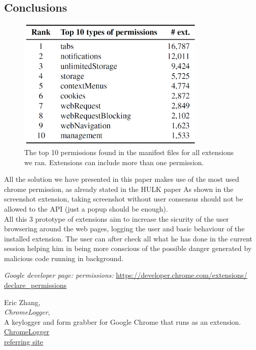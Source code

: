 \documentclass[12pt]{article}
\begin{document}
\begin{multicols}{2}
\section*{Conclusions}
\begin{figure}[H]
	\begin{center}
		\includegraphics[width=9cm]{permission.png}
		\caption{The top 10 permissions found in the manifest
			files for all extensions we ran. Extensions can include			
			more than one permission.}
	\end{center}
\end{figure}
All the solution we have presented in this paper makes use of the most used chrome permission, as already stated in the HULK paper\cite{HULK}
As shown in the screenshot extension, taking screenshot without user consensus should not be allowed to the API (just a popup should be enough). \\
All this 3 prototype of extensions aim to increase the sicurity of the user browsering around the web pages, logging the user and basic behaviour of the installed extension. The user can after check all what he has done in the current session helping him in being more conscious of the possible danger generated by malicious code running in background.
\begin{thebibliography}{3}
	\emph{Google developer page: permissions:}
	\href{https://developer.chrome.com/extensions/declare_permissions}{https://developer.chrome.com/extensions/\\declare\_permissions}
	
	Eric Zhang,\\
	\emph{ChromeLogger},\\
A keylogger and form grabber for Google Chrome that runs as an extension.\\
\href{https://github.com/Xeroday/ChromeLogger}{ChromeLogger}\\
\href{https://www.ericzhang.me/projects/chromelogger/}{referring site}


\end{thebibliography}
\end{multicols}
\end{document}
